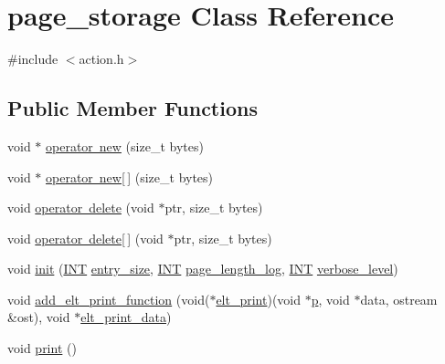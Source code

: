 \hypertarget{classpage__storage}{}\section{page\+\_\+storage Class Reference}
\label{classpage__storage}


{\ttfamily \#include $<$action.\+h$>$}

\subsection*{Public Member Functions}
\begin{DoxyCompactItemize}
\item 
void $\ast$ \mbox{\hyperlink{classpage__storage_a63e3a96325570d8203f393046c604baf}{operator new}} (size\+\_\+t bytes)
\item 
void $\ast$ \mbox{\hyperlink{classpage__storage_a57f728ef5cf701d8980d8a0be688a282}{operator new\mbox{[}$\,$\mbox{]}}} (size\+\_\+t bytes)
\item 
void \mbox{\hyperlink{classpage__storage_acd19dee819277bdba2b0250861ca0e66}{operator delete}} (void $\ast$ptr, size\+\_\+t bytes)
\item 
void \mbox{\hyperlink{classpage__storage_a05ce8987a41317d29b96c3f59d23ec05}{operator delete\mbox{[}$\,$\mbox{]}}} (void $\ast$ptr, size\+\_\+t bytes)
\item 
void \mbox{\hyperlink{classpage__storage_a53d9d92efcff0000764402fcf7cef6e2}{init}} (\mbox{\hyperlink{galois_8h_a09fddde158a3a20bd2dcadb609de11dc}{I\+NT}} \mbox{\hyperlink{classpage__storage_a1b79146c33d9a8e86fb3bfce780929d8}{entry\+\_\+size}}, \mbox{\hyperlink{galois_8h_a09fddde158a3a20bd2dcadb609de11dc}{I\+NT}} \mbox{\hyperlink{classpage__storage_aed45e309e22c067ac0ee69360379cb0c}{page\+\_\+length\+\_\+log}}, \mbox{\hyperlink{galois_8h_a09fddde158a3a20bd2dcadb609de11dc}{I\+NT}} \mbox{\hyperlink{simeon_8_c_a818073fbcc2f439e7c56952f67386122}{verbose\+\_\+level}})
\item 
void \mbox{\hyperlink{classpage__storage_a7f239203bcb8c74f628993ea03c5d996}{add\+\_\+elt\+\_\+print\+\_\+function}} (void($\ast$\mbox{\hyperlink{classpage__storage_aa21cef3dca005352aa9e447ab5070c85}{elt\+\_\+print}})(void $\ast$\mbox{\hyperlink{alphabet2_8_c_a533391314665d6bf1b5575e9a9cd8552}{p}}, void $\ast$data, ostream \&ost), void $\ast$\mbox{\hyperlink{classpage__storage_aec80ee934d016857f972cfd2e95a7344}{elt\+\_\+print\+\_\+data}})
\item 
void \mbox{\hyperlink{classpage__storage_a61e349f7431f6e16328bcfbc7e1d5633}{print}} ()

\end{DoxyCompactItemize}
